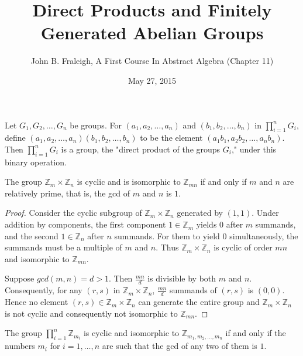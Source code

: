 \documentclass[a4paper,11pt]{article}
\title{Direct Products and Finitely Generated Abelian Groups}
\author{John B. Fraleigh, A First Course In Abstract Algebra (Chapter 11)}
\date{May 27, 2015}
\begin{document}
\maketitle
{}

\begin{outline}

    Let \(G_{1}, G_{2}, \ldots, G_{n}\) be groups. For \((a_{1}, a_{2}, \ldots, a_{n})\) and
    \((b_{1}, b_{2}, \ldots, b_{n})\) in \(\prod_{i=1}^{n} G_{i}\), define \((a_{1}, a_{2}, \ldots, 
    a_{n})(b_{1},  b_{2}, \ldots, b_{n})\) to be the element \((a_{1}b_{1}, a_{2}b_{2}, \ldots, a_{n}b_{n})\). Then 
    \(\prod_{i=1}^{n} G_{i}\) is a group, the "direct product of the groups \(G_{i}\)," under this binary operation.
    
    The group \(\mathbb{Z}_{m} \times \mathbb{Z}_{n}\) is cyclic and is isomorphic to 
    \(\mathbb{Z}_{mn}\) if and only if \(m\) and \(n\) are relatively prime, that is, the gcd of \(m\) and \(n\)
    is \(1\).
    
    \begin{proof}
      \forward 
        Consider the cyclic subgroup of \(\mathbb{Z}_{m} \times \mathbb{Z}_{n}\) generated 
        by \((1, 1)\). Under addition by components, the first component \(1 \in \mathbb{Z}_{m}\) yields \(0\) 
        after \(m\) summands, and the second \(1 \in \mathbb{Z}_{n}\) after \(n\) summands. For them to 
        yield \(0\) simultaneously, the summands must be a multiple of \(m\) and \(n\). Thus 
        \(\mathbb{Z}_{m} \times \mathbb{Z}_{n}\) is cyclic of order \(mn\) and isomorphic to \(\mathbb{Z}_{mn}\).
        
      \backward 
        Suppose \(gcd(m, n) = d > 1\). Then \(\frac{mn}{d}\) is divisible by both \(m\) and \(n\). 
        Consequently, for any \((r, s)\) in \(\mathbb{Z}_{m} \times \mathbb{Z}_{n}\), \(\frac{mn}{d}\) summands
        of \((r, s)\) is \((0, 0)\). Hence no element \((r, s) \in \mathbb{Z}_{m} \times \mathbb{Z}_{n}\) can
        generate the entire group and \(\mathbb{Z}_{m} \times \mathbb{Z}_{n}\) is not cyclic and consequently not
        isomorphic to \(\mathbb{Z}_{mn}\).
        
    \end{proof}
    
    The group \(\prod_{i=1}^{n} \mathbb{Z}_{m_{i}}\) is cyclic and isomorphic to \(\mathbb{Z}_{m_{1}, 
    m_{2}, \ldots, m_{n}}\) if and only if the numbers \(m_{i}\) for \(i = 1, \ldots, n\) are such that 
    the gcd of any two of them is \(1\).
    

\end{outline}
\end{document}
